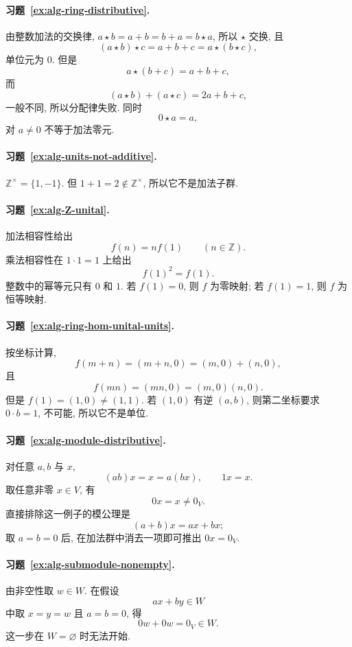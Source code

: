 \documentclass[usesamecnt, thmcnt=section, lang=cn, newtx, 10pt, scheme=chinese]{elegantbook}
\begin{document}
\paragraph*{习题~\ref{ex:alg-ring-distributive}.}
由整数加法的交换律, $a\star b=a+b=b+a=b\star a$, 所以 $\star$ 交换, 且
\[
 (a\star b)\star c=a+b+c=a\star(b\star c),
\]
单位元为 $0$. 但是
\[
 a\star(b+c)=a+b+c,
\]
而
\[
 (a\star b)+(a\star c)=2a+b+c,
\]
一般不同, 所以分配律失败. 同时
\[
 0\star a=a,
\]
对 $a\neq0$ 不等于加法零元.

\paragraph*{习题~\ref{ex:alg-units-not-additive}.}
$\mathbb Z^\times=\{1,-1\}$. 但 $1+1=2\notin\mathbb Z^\times$, 所以它不是加法子群.



\paragraph*{习题~\ref{ex:alg-Z-unital}.}
加法相容性给出
\[
 f(n)=nf(1)\qquad(n\in\mathbb Z).
\]
乘法相容性在 $1\cdot1=1$ 上给出
\[
 f(1)^2=f(1).
\]
整数中的幂等元只有 $0$ 和 $1$. 若 $f(1)=0$, 则 $f$ 为零映射; 若 $f(1)=1$, 则 $f$ 为恒等映射.

\paragraph*{习题~\ref{ex:alg-ring-hom-unital-units}.}
按坐标计算,
\[
 f(m+n)=(m+n,0)=(m,0)+(n,0),
\]
且
\[
 f(mn)=(mn,0)=(m,0)(n,0).
\]
但是 $f(1)=(1,0)\neq(1,1)$. 若 $(1,0)$ 有逆 $(a,b)$, 则第二坐标要求 $0\cdot b=1$, 不可能, 所以它不是单位.


\paragraph*{习题~\ref{ex:alg-module-distributive}.}
对任意 $a,b$ 与 $x$,
\[
 (ab)x=x=a(bx),
 \qquad
 1x=x.
\]
取任意非零 $x\in V$, 有
\[
 0x=x\neq0_V.
\]
直接排除这一例子的模公理是
\[
 (a+b)x=ax+bx;
\]
取 $a=b=0$ 后, 在加法群中消去一项即可推出 $0x=0_V$.

\paragraph*{习题~\ref{ex:alg-submodule-nonempty}.}
由非空性取 $w\in W$. 在假设
\[
 ax+by\in W
\]
中取 $x=y=w$ 且 $a=b=0$, 得
\[
 0w+0w=0_V\in W.
\]
这一步在 $W=\varnothing$ 时无法开始.
\end{document}
